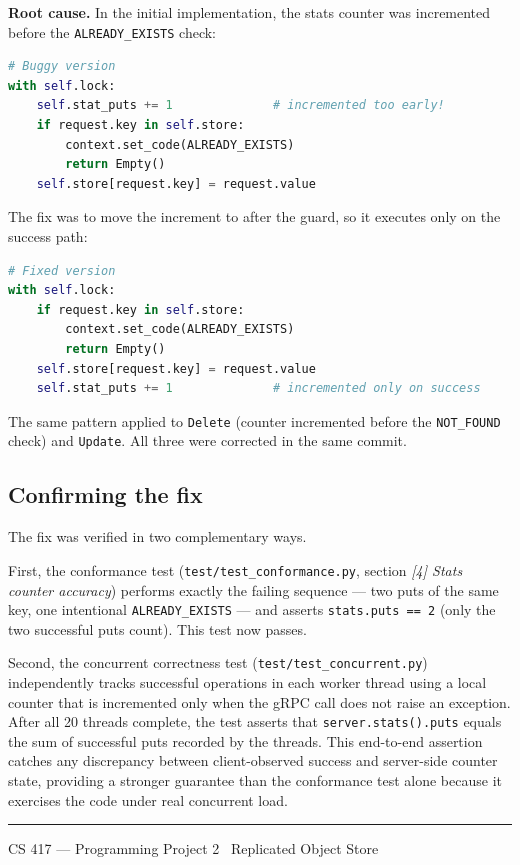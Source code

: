 \documentclass[11pt,letterpaper]{article}
\begin{document}
\textbf{Root cause.}
In the initial implementation, the stats counter was incremented before the
\texttt{ALREADY\_EXISTS} check:

\begin{lstlisting}[language=Python]
# Buggy version
with self.lock:
    self.stat_puts += 1              # incremented too early!
    if request.key in self.store:
        context.set_code(ALREADY_EXISTS)
        return Empty()
    self.store[request.key] = request.value
\end{lstlisting}

The fix was to move the increment to after the guard, so it executes only on
the success path:

\begin{lstlisting}[language=Python]
# Fixed version
with self.lock:
    if request.key in self.store:
        context.set_code(ALREADY_EXISTS)
        return Empty()
    self.store[request.key] = request.value
    self.stat_puts += 1              # incremented only on success
\end{lstlisting}

The same pattern applied to \texttt{Delete} (counter incremented before the
\texttt{NOT\_FOUND} check) and \texttt{Update}. All three were corrected in the
same commit.

\subsection{Confirming the fix}

The fix was verified in two complementary ways.

First, the conformance test (\texttt{test/test\_conformance.py}, section
\emph{[4] Stats counter accuracy}) performs exactly the failing sequence —
two puts of the same key, one intentional \texttt{ALREADY\_EXISTS} — and
asserts \texttt{stats.puts\,==\,2} (only the two successful puts count).
This test now passes.

Second, the concurrent correctness test (\texttt{test/test\_concurrent.py})
independently tracks successful operations in each worker thread using a local
counter that is incremented only when the gRPC call does not raise an
exception.
After all 20 threads complete, the test asserts that
\texttt{server.stats().puts} equals the sum of successful puts recorded by the
threads.
This end-to-end assertion catches any discrepancy between client-observed
success and server-side counter state, providing a stronger guarantee than the
conformance test alone because it exercises the code under real concurrent
load.

\vspace{12pt}
\noindent\rule{\linewidth}{0.5pt}
\begin{center}
    \small\color{gray}
    CS 417 — Programming Project 2 \textbullet\ Replicated Object Store
\end{center}
\end{document}
